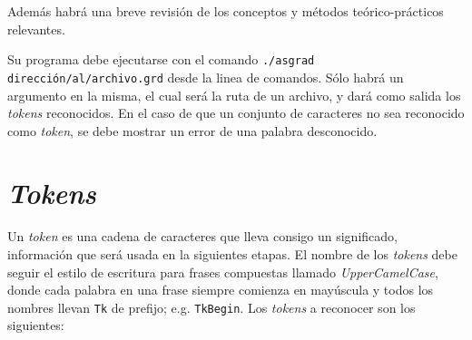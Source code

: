 \documentclass[letterpaper,10pt]{article}
\newcommand{\ttt}[1]{\texttt{#1}}
\begin{document}
\noindent
Además habrá una breve revisión de los conceptos y métodos teórico-prácticos relevantes.

Su programa debe ejecutarse con el comando \texttt{./asgrad dirección/al/archivo.grd} desde la linea de comandos. Sólo habrá un argumento en la misma, el cual será la ruta de un archivo, y dará como salida los \textit{tokens} reconocidos. En el caso de que un conjunto de caracteres no sea reconocido como \textit{token}, se debe mostrar un error de una palabra desconocido.

\section{\textit{Tokens}}

Un \textit{token} es una cadena de caracteres que lleva consigo un significado, información que será usada en la siguientes etapas. El nombre de los \textit{tokens} debe seguir el estilo de escritura para frases compuestas llamado \textit{UpperCamelCase}, donde cada palabra en una frase siempre comienza en mayúscula y todos los nombres llevan \ttt{Tk} de prefijo; e.g. \ttt{TkBegin}. Los \textit{tokens} a reconocer son los siguientes:
\end{document}
